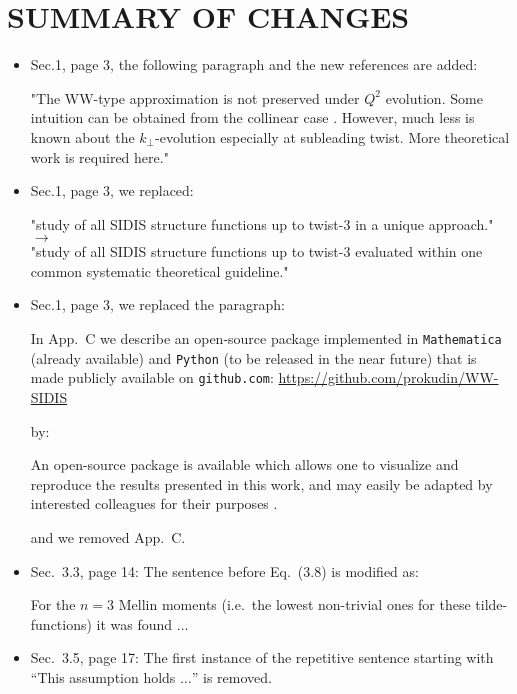 \documentclass[a4paper,11pt]{article}
\begin{document}
\section*{SUMMARY OF CHANGES}

\begin{itemize}

\item
Sec.1, page 3, the following paragraph and the new references
\cite{Ali:1991em,Koike:1994st,Balitsky:1996uh,Belitsky:1997zw} are added:

"The WW-type approximation is not preserved under $Q^2$ evolution.
 Some intuition can be obtained from the collinear case
 \cite{Ali:1991em,Koike:1994st,Balitsky:1996uh,Belitsky:1997zw}. 
 However, much less is known about the $k_\perp$-evolution especially at 
 subleading twist. More theoretical work is required here."

\item
Sec.1, page 3, we replaced: 

"study of all SIDIS structure functions up to twist-3 in a unique approach."
$\to$\\
"study of all SIDIS structure functions up to twist-3 evaluated within one
common systematic theoretical guideline."

\item
Sec.1, page 3, we replaced the paragraph:

	In App.~C we describe an open-source package implemented
	in \texttt{Mathematica}~\cite{Mathematica} (already available)
	and \texttt{Python} (to be released in the near future) that is
	made publicly available on \texttt{github.com}: {\href{
	https://github.com/prokudin/WW-SIDIS}{
	https://github.com/prokudin/WW-SIDIS}}

by:

	An open-source package is available which allows one to visualize 
	and reproduce the results presented in this work, and may easily 
	be adapted by interested colleagues for their purposes
	\cite{Mathematica}.

and we removed App.~C.


\item
Sec.~3.3, page 14: The sentence before Eq.~(3.8) is modified as:

	For the $n = 3$ Mellin moments (i.e.\ the lowest non-trivial ones 
	for these tilde-functions) it was found $\dots$

\item
Sec.~3.5, page 17: The first instance of the repetitive sentence 
starting with ``This assumption holds $\dots$'' is removed.



\end{itemize}
\end{document}
